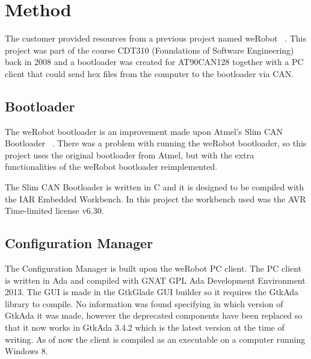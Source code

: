 \section{Method}\label{sec:method}
The customer provided resources from a previous project named weRobot ~\cite{web:werobot}. This project was part of the course CDT310 (Foundations of Software Engineering) back in 2008 and a bootloader was created for AT90CAN128 together with a PC client that could send hex files from the computer to the bootloader via CAN.

\pagebreak
\subsection{Bootloader}
The weRobot bootloader is an improvement made upon Atmel's Slim CAN Bootloader ~\cite{web:slimbootloader}. There was a problem with running the weRobot bootloader, so this project uses the original bootloader from Atmel, but with the extra functionalities of the weRobot bootloader reimplemented.

The Slim CAN Bootloader is written in C and it is designed to be compiled with the IAR Embedded Workbench. In this project the workbench used was the AVR Time-limited license v6.30.

\subsection{Configuration Manager}
The Configuration Manager is built upon the weRobot PC client. The PC client is written in Ada and compiled with GNAT GPL Ada Development Environment 2013.
The GUI is made in the GtkGlade GUI builder so it requires the GtkAda ~\cite{web:gtkada} library to compile. No information was found specifying in which version of GtkAda it was made, however the deprecated components have been replaced so that it now works in GtkAda 3.4.2 which is the latest version at the time of writing. As of now the client is compiled as an executable on a computer running Windows 8.
